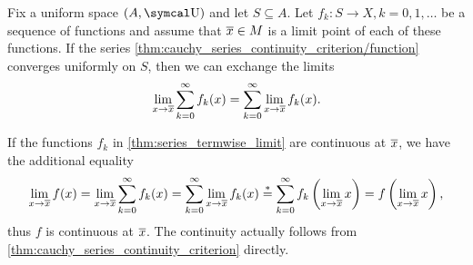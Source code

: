 \begin{theorem}\label{thm:series_termwise_limit}\cite[]{Фихтенгольц1968/2}
  Fix a uniform space \( (A, \U) \) and let \( S \subseteq A \). Let \( f_k: S \to X, k = 0, 1, \ldots \) be a sequence of functions and assume that \( \overline{x} \in M \) is a limit point of each of these functions. If the series \cref{thm:cauchy_series_continuity_criterion/function} converges uniformly on \( S \), then we can exchange the limits
  \begin{equation}\label{thm:series_termwise_limit/equality}
    \lim_{x \to \overline{x}} \sum_{k=0}^\infty f_k(x)
    =
    \sum_{k=0}^\infty \lim_{x \to \overline{x}} f_k(x).
  \end{equation}
\end{theorem}

\begin{remark}\label{remark:series_termwise_limit_continuity}
  If the functions \( f_k \) in \cref{thm:series_termwise_limit} are continuous at \( \overline{x} \), we have the additional equality
  \begin{equation}\label{thm:series_termwise_limit/continuous_equality}
    \lim_{x \to \overline{x}} f(x)
    =
    \lim_{x \to \overline{x}} \sum_{k=0}^\infty f_k(x)
    =
    \sum_{k=0}^\infty \lim_{x \to \overline{x}} f_k(x)
    \overset * =
    \sum_{k=0}^\infty f_k\left(\lim_{x \to \overline{x}} x \right)
    =
    f\left(\lim_{x \to \overline{x}} x \right),
  \end{equation}
  thus \( f \) is continuous at \( \overline{x} \). The continuity actually follows from \cref{thm:cauchy_series_continuity_criterion} directly.
\end{remark}
